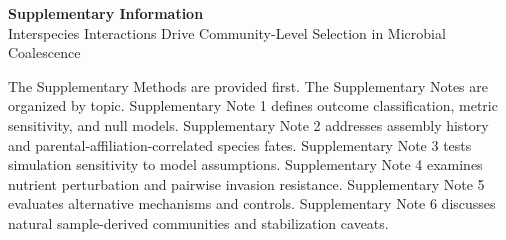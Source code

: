 \documentclass[11pt,a4paper]{article}
\begin{document}
\begin{center}
{\LARGE \textbf{Supplementary Information}}\\[1em]
{\large Interspecies Interactions Drive Community-Level Selection in Microbial Coalescence}\\[0.5em]
\end{center}


The Supplementary Methods are provided first. The Supplementary Notes are organized by topic. Supplementary Note 1 defines outcome classification, metric sensitivity, and null models. Supplementary Note 2 addresses assembly history and parental-affiliation-correlated species fates. Supplementary Note 3 tests simulation sensitivity to model assumptions. Supplementary Note 4 examines nutrient perturbation and pairwise invasion resistance. Supplementary Note 5 evaluates alternative mechanisms and controls. Supplementary Note 6 discusses natural sample-derived communities and stabilization caveats.























\end{document}
